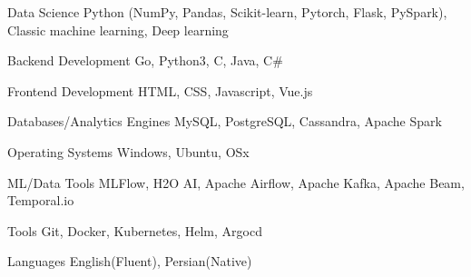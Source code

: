 

\begin{cvskills}

  \cvskill
    {Data Science} %
    {Python (NumPy, Pandas, Scikit-learn, Pytorch, Flask, PySpark), Classic machine learning, Deep learning} %

  \cvskill
    {Backend Development} %
    {Go, Python3, C, Java, C\#} %

  \cvskill
    {Frontend Development} %
    {HTML, CSS, Javascript, Vue.js} %

  \cvskill
    {Databases/Analytics Engines} %
    {MySQL, PostgreSQL, Cassandra, Apache Spark} %

  \cvskill
    {Operating Systems} %
    {Windows, Ubuntu, OSx} %

  \cvskill
    {ML/Data Tools} %
    {MLFlow, H2O AI, Apache Airflow, Apache Kafka, Apache Beam, Temporal.io} %

  \cvskill
    {Tools} %
    {Git, Docker, Kubernetes, Helm, Argocd} %

  \cvskill
    {Languages} %
    {English(Fluent), Persian(Native)} %

\end{cvskills}
